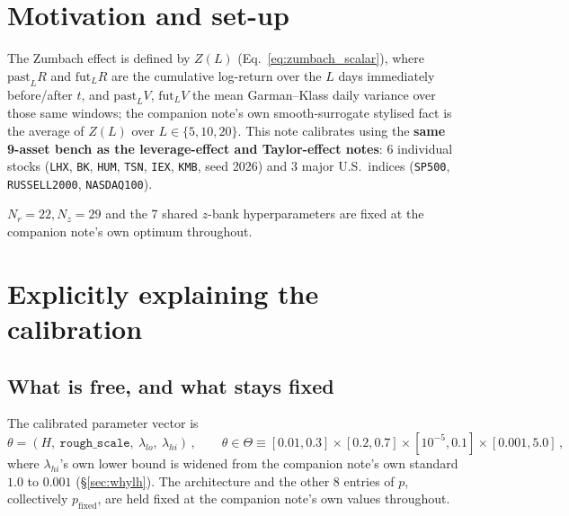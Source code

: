 \documentclass[11pt]{article}
\begin{document}
\tableofcontents

\section{Motivation and set-up}
The Zumbach effect is defined by $Z(L)$ (Eq.~\ref{eq:zumbach_scalar}), where
$\text{past}_L R$ and $\text{fut}_L R$ are the cumulative log-return over the
$L$ days immediately before/after $t$, and $\text{past}_L V$,
$\text{fut}_L V$ the mean Garman--Klass daily variance over those same
windows; the companion note's own smooth-surrogate stylised fact is the
average of $Z(L)$ over $L\in\{5,10,20\}$. This note calibrates using the
\textbf{same 9-asset bench as the leverage-effect and Taylor-effect notes}:
6 individual stocks (\texttt{LHX}, \texttt{BK}, \texttt{HUM}, \texttt{TSN},
\texttt{IEX}, \texttt{KMB}, seed 2026) and 3 major U.S.\ indices
(\texttt{SP500}, \texttt{RUSSELL2000}, \texttt{NASDAQ100}).

$N_r=22,N_z=29$ and the 7 shared $z$-bank hyperparameters are fixed at the
companion note's own optimum throughout.

\section{Explicitly explaining the calibration}
\label{sec:calibmethod}

\subsection{What is free, and what stays fixed}
The calibrated parameter vector is
\begin{equation}
\theta = (H,\ \texttt{rough\_scale},\ \lambda_{lo},\ \lambda_{hi})\, ,
\qquad
\theta \in \Theta \equiv [0.01,0.3]\times[0.2,0.7]\times[10^{-5},0.1]
\times[0.001,5.0]\, ,
\label{eq:zumbachtheta}
\end{equation}
where $\lambda_{hi}$'s own lower bound is widened from the companion note's
own standard $1.0$ to $0.001$ (\S\ref{sec:whylh}). The architecture and the
other 8 entries of $p$, collectively $p_{\text{fixed}}$, are held fixed at the
companion note's own values throughout.
\end{document}

